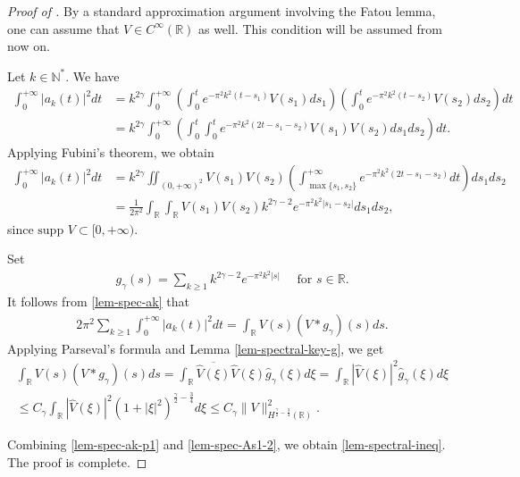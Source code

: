 \documentclass[11pt, reqno]{amsart}
\theoremstyle{plain}
\numberwithin{equation}{section}
\newcommand{\mR}{\mathbb{R}}
\newcommand{\mN}{\mathbb{N}}
\begin{document}
\begin{proof}[Proof of ] By a standard approximation argument involving the Fatou lemma, one can assume that $V \in C^{\infty}(\mR)$ as well. This condition will be assumed from now on.

\medskip
Let $k \in \mN^*$. We have
\begin{align*}
	\int_0^{+\infty} |a_k(t)|^2 dt &= k^{2 \gamma} \int_0^{+\infty} \left(\int_0^t e^{- \pi^2 k^2 (t - s_1)} V(s_1) ds_1 \right) \left(\int_0^t e^{- \pi^2 k^2 (t - s_2)} V(s_2) ds_2 \right) dt  \nonumber \\[6pt]
	&= k^{2 \gamma} \int_0^{+\infty} \left(\int_0^t \int_0^t e^{- \pi^2 k^2 (2t - s_1 - s_2)} V(s_1) V(s_2) ds_1 ds_2 \right) dt.  
\end{align*}
Applying Fubini's theorem, we obtain 
\begin{align}
	\int_0^{+\infty} |a_k(t)|^2 dt &= k^{2 \gamma} \iint_{(0, +\infty)^2}  V(s_1) V(s_2) \left(\int_{\max\{s_1, s_2\}}^{+\infty} e^{- \pi^2 k^2 (2t - s_1 - s_2)} dt \right) ds_1 ds_2 \nonumber \\[6pt]
	&= \frac{1}{2 \pi^2} \int_{\mR} \int_{\mR} V(s_1) V(s_2) k^{2\gamma - 2} e^{- \pi^2 k^2 |s_1 - s_2|} ds_1 ds_2, 		\label{lem-spec-ak}
\end{align}
since $\mbox{supp } V \subset [0, + \infty)$.


Set 
\begin{align*}		g_{\gamma}(s) = \sum_{k \geq 1} k^{2 \gamma - 2} e^{- \pi^2 k^2 |s|} \quad \text{ for } s \in \mR.
\end{align*}
It follows from \eqref{lem-spec-ak} that 
\begin{align} \label{lem-spec-ak-p1}
	2 \pi^2 \sum_{k \geq 1} \int_0^{+\infty} |a_k(t)|^2 dt  = \int_{\mR} V(s) (V \ast g_{\gamma})(s) ds. 
\end{align}
Applying Parseval's formula and Lemma \ref{lem-spectral-key-g}, we get
\begin{multline}		\label{lem-spec-As1-2}	
\int_{\mR} V(s) (V \ast g_{\gamma})(s) ds = \int_{\mR}  \overline{\hat{V}(\xi)} \hat{V}(\xi) \hat{g}_{\gamma}(\xi) d\xi = \int_{\mR} |\hat{V}(\xi)|^2 \hat{g}_{\gamma}(\xi) d\xi \\
\leq C_{\gamma} \int_{\mR} |\hat{V}(\xi)|^2 \left(1 + |\xi|^2 \right)^{\frac{\gamma}{2} - \frac{3}{4}} d \xi \leq C_{\gamma} \| V\|_{H^{\frac{\gamma}{2} - \frac{3}{4}}(\mR)}^2.  
\end{multline}
 
Combining \eqref{lem-spec-ak-p1} and \eqref{lem-spec-As1-2}, we obtain \eqref{lem-spectral-ineq}. The proof is complete.
\end{proof}
\end{document}
